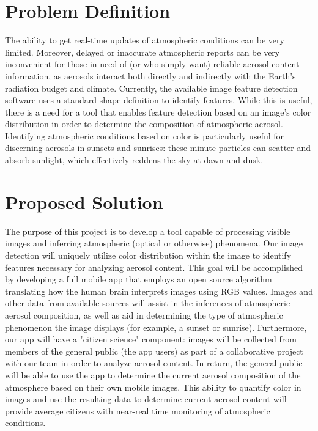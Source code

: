 \documentclass[letterpaper,10pt,draftclsnofoot,onecolumn]{IEEEtran}
\begin{document}
\clearpage
\begin{flushleft}
\section{Problem Definition}
The ability to get real-time updates of atmospheric conditions can be very limited.
Moreover, delayed or inaccurate atmospheric reports can be very inconvenient for those in need of (or who simply want) reliable aerosol content information, as aerosols interact both directly and indirectly with the Earth's radiation budget and climate.
Currently, the available image feature detection software uses a standard shape definition to identify features.
While this is useful, there is a need for a tool that enables feature detection based on an image's color distribution in order to determine the composition of atmospheric aerosol.
Identifying atmospheric conditions based on color is particularly useful for discerning aerosols in sunsets and sunrises: these minute particles can scatter and absorb sunlight, which effectively reddens the sky at dawn and dusk.

\section{Proposed Solution}
The purpose of this project is to develop a tool capable of processing visible images and inferring atmospheric (optical or otherwise) phenomena.
Our image detection will uniquely utilize color distribution within the image to identify features necessary for analyzing aerosol content.
 This goal will be accomplished by developing a full mobile app that employs an open source algorithm translating how the human brain interprets images using RGB values.
Images and other data from available sources will assist in the inferences of atmospheric aerosol composition, as well as aid in determining the type of atmospheric phenomenon the image displays (for example, a sunset or sunrise).
Furthermore, our app will have a "citizen science" component: images will be collected from members of the general public (the app users) as part of a collaborative project with our team in order to analyze aerosol content.
In return, the general public will be able to use the app to determine the current aerosol composition of the atmosphere based on their own mobile images.
This ability to quantify color in images and use the resulting data to determine current aerosol content will provide average citizens with near-real time monitoring of atmospheric conditions.

\end{flushleft}
\end{document}
